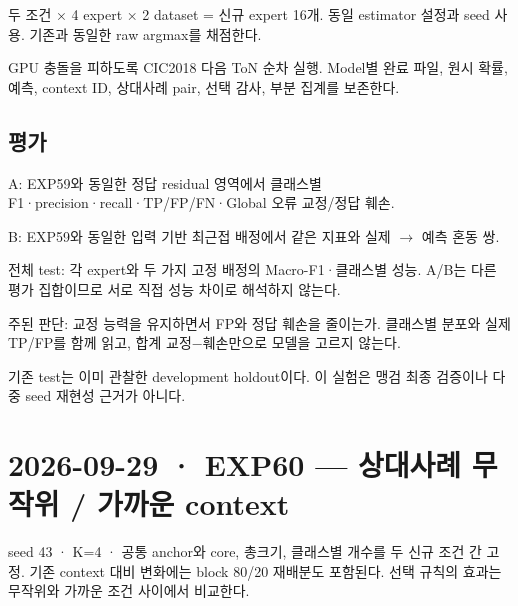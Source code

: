 \par\noindent \textbullet\enspace 두 조건 × 4 expert × 2 dataset =\allowbreak{} 신규 expert 16개. 동일 estimator 설정과 seed 사용. 기존과 동일한 raw argmax를 채점한다.


\par\noindent \textbullet\enspace GPU 충돌을 피하도록 CIC2018 다음 ToN 순차 실행. Model별 완료 파일, 원시 확률, 예측, context ID, 상대사례 pair, 선택 감사, 부분 집계를 보존한다.


\subsection{평가}
\par\noindent \textbullet\enspace A: EXP59와 동일한 정답 residual 영역에서 클래스별 F1·precision·recall·TP/\allowbreak{}FP/\allowbreak{}FN·Global 오류 교정/\allowbreak{}정답 훼손.


\par\noindent \textbullet\enspace B: EXP59와 동일한 입력 기반 최근접 배정에서 같은 지표와 실제 \ensuremath{\rightarrow} 예측 혼동 쌍.


\par\noindent \textbullet\enspace 전체 test: 각 expert와 두 가지 고정 배정의 Macro-F1·클래스별 성능. A/\allowbreak{}B는 다른 평가 집합이므로 서로 직접 성능 차이로 해석하지 않는다.


\par\noindent \textbullet\enspace 주된 판단: 교정 능력을 유지하면서 FP와 정답 훼손을 줄이는가. 클래스별 분포와 실제 TP/\allowbreak{}FP를 함께 읽고, 합계 교정−훼손만으로 모델을 고르지 않는다.


\par\noindent \textbullet\enspace 기존 test는 이미 관찰한 development holdout이다. 이 실험은 맹검 최종 검증이나 다중 seed 재현성 근거가 아니다.




\section{2026-09-29 · EXP60 — 상대사례 무작위 /\allowbreak{} 가까운 context}
\label{report:20260929_exp60_results}
seed 43 · K=\allowbreak{}4 · 공통 anchor와 core, 총크기, 클래스별 개수를 두 신규 조건 간 고정. 기존 context 대비 변화에는 block 80/\allowbreak{}20 재배분도 포함된다. 선택 규칙의 효과는 무작위와 가까운 조건 사이에서 비교한다.

